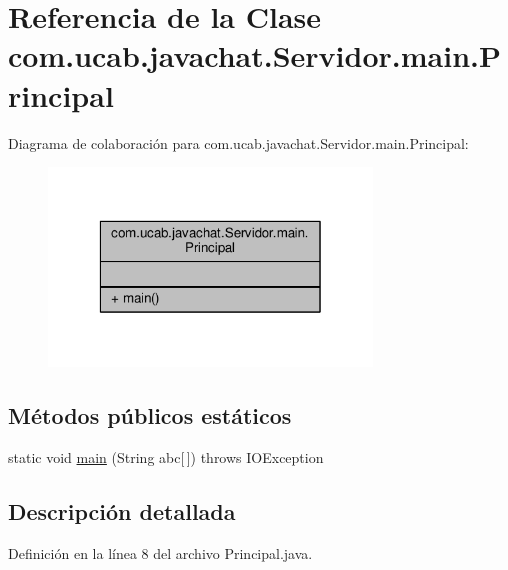 \hypertarget{classcom_1_1ucab_1_1javachat_1_1_servidor_1_1main_1_1_principal}{\section{Referencia de la Clase com.\-ucab.\-javachat.\-Servidor.\-main.\-Principal}
\label{classcom_1_1ucab_1_1javachat_1_1_servidor_1_1main_1_1_principal}
}


Diagrama de colaboración para com.\-ucab.\-javachat.\-Servidor.\-main.\-Principal\-:\nopagebreak
\begin{figure}[H]
\begin{center}
\leavevmode
\includegraphics[width=244pt]{classcom_1_1ucab_1_1javachat_1_1_servidor_1_1main_1_1_principal__coll__graph}
\end{center}
\end{figure}
\subsection*{Métodos públicos estáticos}
\begin{DoxyCompactItemize}
\item 
static void \hyperlink{classcom_1_1ucab_1_1javachat_1_1_servidor_1_1main_1_1_principal_aab5df0d2fa877ce007a67fa8be56df79}{main} (String abc\mbox{[}$\,$\mbox{]})  throws I\-O\-Exception 	   
\end{DoxyCompactItemize}


\subsection{Descripción detallada}


Definición en la línea 8 del archivo Principal.\-java.



